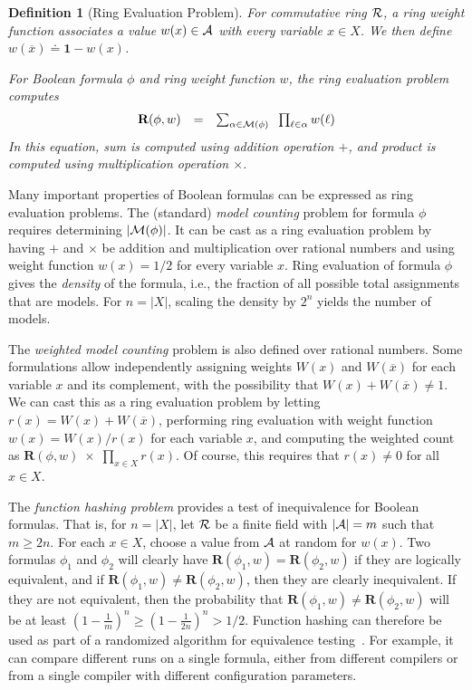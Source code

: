 \documentclass[twoside,11pt]{article}
\newcommand{\obar}[1]{\overline{#1}}
\newcommand{\lit}{\ell}
\newcommand{\varset}{X}
\newcommand{\ring}{{\cal R}}
\newcommand{\dset}{{\cal A}}
\newcommand{\rep}{\textbf{R}}
\newcommand{\radd}{+}
\newcommand{\rmul}{\times}
\newcommand{\mulident}{\textbf{1}}
\newcommand{\modelset}{{\cal M}}
\newtheorem{dfn}{Definition}
\begin{document}
\begin{dfn}[Ring Evaluation Problem]
\label{def:ring_evaluation}
  For commutative ring $\ring$, a \emph{ring weight function} associates a value $w(x) \in \dset$ with
  every variable $x \in \varset$.  We then define $w(\obar{x}) \doteq \mulident-w(x)$.

  For Boolean formula $\phi$ and ring weight function $w$, the \emph{ring evaluation problem} computes
  \begin{equation}
    \begin{array}{rcl}
    \rep(\phi, w) & = & \sum_{\alpha \in \modelset(\phi)} \;\; \prod_{\lit \in \alpha} w(\ell) \label{eqn:rep}
    \end{array}
  \end{equation}
  In this equation, sum \scalebox{0.8}{$\sum$} is computed using addition operation $\radd$, and product \scalebox{0.8}{$\prod$} is computed using multiplication operation $\rmul$.
\label{def:weight}
\end{dfn}

Many important properties of Boolean formulas can be
expressed as ring evaluation problems.  The
(standard) \emph{model counting} problem for formula $\phi$ requires determining $|\modelset(\phi)|$.
It can be cast as a ring evaluation problem by having $\radd$ and
$\rmul$ be addition and multiplication over rational numbers and using
weight function $w(x) = 1/2$ for every variable $x$.
Ring evaluation of formula $\phi$ gives the \emph{density} of
the formula, i.e., the fraction of all possible total assignments that are
models.  For $n = |\varset|$, scaling the density by $2^n$
yields the number of models.

The \emph{weighted model counting}  problem is also defined over
rational numbers.  Some formulations  allow
independently assigning weights $W(x)$ and $W(\obar{x})$ for each variable $x$ and its complement, with the possibility that
$W(x) + W(\obar{x}) \not = 1$.
We can cast this as a
ring evaluation problem by letting $r(x) = W(x) + W(\obar{x})$,
performing ring evaluation with weight function $w(x) = W(x)/r(x)$ for each
variable $x$, and computing the weighted count
as $\rep(\phi, w)\; \rmul\; \prod_{x \in \varset} r(x)$.
Of course, this requires that $r(x) \not = 0$ for all $x \in \varset$.

The \emph{function hashing problem} provides a test
of inequivalence for Boolean formulas.  That is, for $n = |\varset|$, let $\ring$ be a
finite  field with $|\dset| = m$ such that $m \geq 2 n$.  For each $x \in \varset$, choose a value from $\dset$ at random for $w(x)$.  Two formulas
$\phi_1$ and $\phi_2$ will clearly have $\rep(\phi_1, w) = \rep(\phi_2, w)$
if they are logically equivalent,
and if $\rep(\phi_1, w) \not = \rep(\phi_2, w)$, then they are clearly inequivalent.
If they are not equivalent, then
the probability that $\rep(\phi_1, w) \not = \rep(\phi_2, w)$ will be at
least $\left(1-\frac{1}{m}\right)^n \geq \left(1-\frac{1}{2n}\right)^n > 1/2$.
Function hashing can therefore be used as part of a
randomized algorithm for equivalence testing~\cite{blum:ipl:1980}.
For example, it can compare different runs on a single formula,
either from different compilers or from a single compiler with different configuration parameters.
\end{document}

